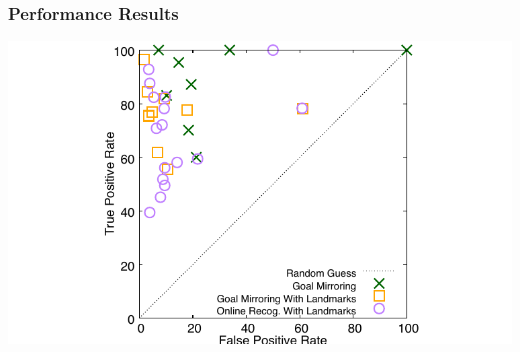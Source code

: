 \documentclass{beamer}
\begin{document}
%
%
%
%
%
%
%
%
	
	\begin{frame}[c]\frametitle{Performance Results}
		\begin{center}
			\includegraphics[width=.8\textwidth]{roc_space-online_approaches/rocspace-all_domains-online.pdf}
		\end{center}
	\end{frame}
	
\end{document}
